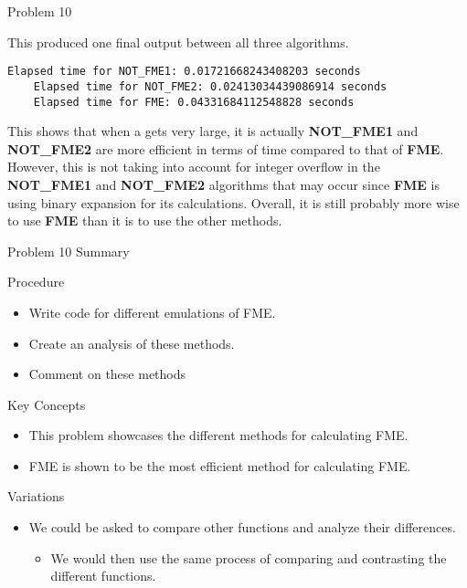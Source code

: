 \begin{problem}{Problem 10}
\begin{Highlight}[Solution]
        This produced one final output between all three algorithms.
    \begin{lstlisting}[style=stackoverflow]
    Elapsed time for NOT_FME1: 0.01721668243408203 seconds
    Elapsed time for NOT_FME2: 0.02413034439086914 seconds
    Elapsed time for FME: 0.04331684112548828 seconds
    \end{lstlisting}

        This shows that when a gets very large, it is actually \textbf{NOT\_FME1} and \textbf{NOT\_FME2} are more efficient in terms of time compared to that of \textbf{FME}. However, this is not taking into
        account for integer overflow in the \textbf{NOT\_FME1} and \textbf{NOT\_FME2} algorithms that may occur since \textbf{FME} is using binary expansion for its calculations. Overall, it is still
        probably more wise to use \textbf{FME} than it is to use the other methods.
    \end{Highlight}
\end{problem}

\begin{summary}{Problem 10 Summary}
    \begin{statement}{Procedure}
        \begin{itemize}
            \item Write code for different emulations of FME.
            \item Create an analysis of these methods.
            \item Comment on these methods
        \end{itemize}
    \end{statement}
    \begin{statement}{Key Concepts}
        \begin{itemize}
            \item This problem showcases the different methods for calculating FME.
            \item FME is shown to be the most efficient method for calculating FME.
        \end{itemize}
    \end{statement}
    \begin{statement}{Variations}
        \begin{itemize}
            \item We could be asked to compare other functions and analyze their differences.
            \begin{itemize}
                \item We would then use the same process of comparing and contrasting the different functions.
            \end{itemize}
        \end{itemize}
    \end{statement}
\end{summary}